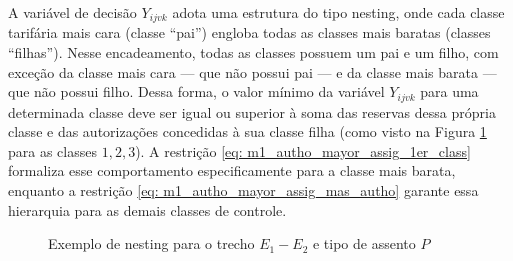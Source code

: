 A variável de decisão $Y_{ijvk}$ adota uma estrutura do tipo nesting, onde cada classe tarifária mais cara (classe “pai”) engloba todas as classes mais baratas (classes “filhas”). Nesse encadeamento, todas as classes possuem um pai e um filho, com exceção da classe mais cara — que não possui pai — e da classe mais barata — que não possui filho. Dessa forma, o valor mínimo da variável $Y_{ijvk}$ para uma determinada classe deve ser igual ou superior à soma das reservas dessa própria classe e das autorizações concedidas à sua classe filha (como visto na Figura \ref{fig: nesting} para as classes $1, 2, 3$). A restrição \eqref{eq: m1_autho_mayor_assig_1er_class} formaliza esse comportamento especificamente para a classe mais barata, enquanto a restrição \eqref{eq: m1_autho_mayor_assig_mas_autho} garante essa hierarquia para as demais classes de controle.
\begin{figure}[H]
	\begin{center}
	\end{center}
	\caption{Exemplo de nesting para o trecho $E_1 - E_2$ e tipo de assento $P$}
	\label{fig: nesting}
\end{figure}
